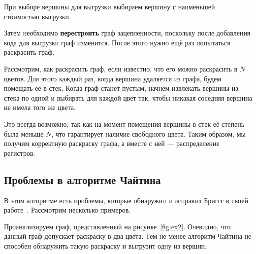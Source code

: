 При выборе вершины для выгрузки выбираем вершину с наименьшей стоимостью выгрузки.

Затем необходимо \textbf{перестроить} граф зацепленности,
поскольку после добавления кода для выгрузки граф изменится.
После этого нужно ещё раз попытаться раскрасить граф.

Рассмотрим, как раскрасить граф, если известно, что его можно раскрасить в $N$ цветов.
Для этого каждый раз, когда вершина удаляется из графа, будем помещать её в стек.
Когда граф станет пустым, начнём извлекать вершины из стека по одной и выбирать для каждой цвет так,
чтобы никакая соседняя вершина не имела того же цвета.

Это всегда возможно, так как на момент помещения вершины в стек её степень была меньше $N$, что гарантирует наличие свободного
цвета. Таким образом, мы получим корректную раскраску графа, а вместе с ней — распределение регистров.

\subsection{Проблемы в алгоритме Чайтина}

В этом алгоритме есть проблемы, которые обнаружил и исправил Бриггс в своей работе~\cite{briggs1994}.
Рассмотрим несколько примеров.

Проанализируем граф, представленный на рисунке~\ref{fig:ex2}. Очевидно, что данный граф допускает раскраску в два цвета.  
Тем не менее алгоритм Чайтина не способен обнаружить такую раскраску и выгрузит одну из вершин.

\begin{figure}[H]
    \centering
\end{figure} %

